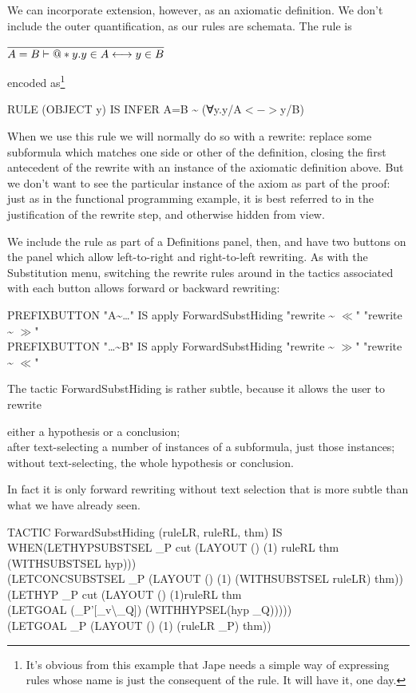 We can incorporate extension, however, as an axiomatic definition. We don't include the outer quantification, as our rules are schemata. The rule is


$\infer{A=B |- @*y.y\in A<->y\in B}
       {}$

encoded as\footnote{It's obvious from this example that Jape needs a simple way of expressing rules whose name is just the consequent of the rule. It will have it, one day.}

RULE (OBJECT y) IS INFER A=B \~{} (∀y.y/A$<->$y/B)


When we use this rule we will normally do so with a rewrite: replace some subformula which matches one side or other of the definition, closing the first antecedent of the rewrite with an instance of the axiomatic definition above. But we don't want to see the particular instance of the axiom as part of the proof: just as in the functional programming example, it is best referred to in the justification of the rewrite step, and otherwise hidden from view.


We include the rule as part of a Definitions panel, then, and have two buttons on the panel which allow left-to-right and right-to-left rewriting. As with the Substitution menu, switching the rewrite rules around in the tactics associated with each button allows forward or backward rewriting:

PREFIXBUTTON "A\~{}\dots " IS apply ForwardSubstHiding "rewrite \~{} $\ll$" "rewrite \~{} $\gg$"\\
PREFIXBUTTON "\dots \~{}B" IS apply ForwardSubstHiding "rewrite \~{} $\gg$" "rewrite \~{} $\ll$"


The tactic ForwardSubstHiding is rather subtle, because it allows the user to rewrite


{\textbullet}\tab either a hypothesis or a conclusion;\\
{\textbullet}\tab after text-selecting a number of instances of a subformula, just those instances;\\
{\textbullet}\tab without text-selecting, the whole hypothesis or conclusion.


In fact it is only forward rewriting without text selection that is more subtle than what we have already seen.

TACTIC ForwardSubstHiding (ruleLR, ruleRL, thm) IS\\
\tab WHEN\tab (LETHYPSUBSTSEL \_P cut (LAYOUT () (1) ruleRL thm (WITHSUBSTSEL hyp)))\\
\tab \tab (LETCONCSUBSTSEL \_P (LAYOUT () (1) (WITHSUBSTSEL ruleLR) thm))\\
\tab \tab (LETHYP \_P cut (LAYOUT () (1)\tab ruleRL thm \\
\tab \tab \tab (LETGOAL (\_P'[\_v{\textbackslash}\_Q]) (WITHHYPSEL(hyp \_Q)))))\\
\tab \tab (LETGOAL \_P (LAYOUT () (1) (ruleLR \_P) thm))


